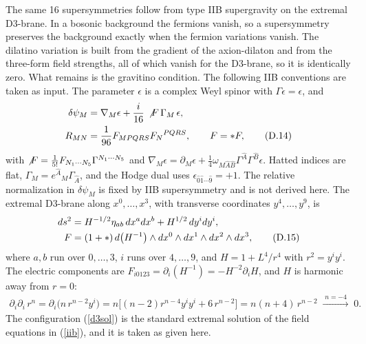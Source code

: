 \begin{tcolorbox}[breakable]
\begin{remark}
The same 16 supersymmetries follow from type IIB supergravity on the extremal D3-brane. In a bosonic background the fermions vanish, so a supersymmetry preserves the background exactly when the fermion variations vanish. The dilatino variation is built from the gradient of the axion-dilaton and from the three-form field strengths, all of which vanish for the D3-brane, so it is identically zero. What remains is the gravitino condition. The following IIB conventions are taken as input. The parameter $\epsilon$ is a complex Weyl spinor with $\Gamma\epsilon=\epsilon$, and
\begin{align}
\delta\psi_M &= \nabla_M\epsilon + \frac{i}{16}\,\slashed F\,\Gamma_M\,\epsilon, \notag\\
R_{MN} &= \frac{1}{96}F_{MPQRS}F_N{}^{PQRS}, \qquad F = *F ,
\tag{D.14}\label{iib}
\end{align}
with $\slashed F = \frac{1}{5!}F_{N_1\cdots N_5}\Gamma^{N_1\cdots N_5}$ and $\nabla_M\epsilon = \partial_M\epsilon + \frac14\omega_{M\hat A\hat B}\Gamma^{\hat A}\Gamma^{\hat B}\epsilon$. Hatted indices are flat, $\Gamma_M = e^{\hat A}{}_M\Gamma_{\hat A}$, and the Hodge dual uses $\epsilon_{\hat0\hat1\cdots\hat9} = +1$. The relative normalization in $\delta\psi_M$ is fixed by IIB supersymmetry and is not derived here. The extremal D3-brane along $x^0,\dots,x^3$, with transverse coordinates $y^4,\dots,y^9$, is
\begin{align}
ds^2 &= H^{-1/2}\eta_{ab}\,dx^a dx^b + H^{1/2}\,dy^i dy^i, \notag\\
F &= (1+*)\,d\big(H^{-1}\big)\wedge dx^0\wedge dx^1\wedge dx^2\wedge dx^3 ,
\tag{D.15}\label{d3sol}
\end{align}
where $a,b$ run over $0,\dots,3$, $i$ runs over $4,\dots,9$, and $H = 1+L^4/r^4$ with $r^2 = y^iy^i$. The electric components are $F_{i0123} = \partial_i(H^{-1}) = -H^{-2}\partial_iH$, and $H$ is harmonic away from $r=0$:
\begin{align*}
\partial_i\partial_i\, r^n = \partial_i\big(n\,r^{n-2}y^i\big) = n\big[(n-2)r^{n-4}y^iy^i + 6\,r^{n-2}\big] = n(n+4)\,r^{n-2} \;\xrightarrow{\;n=-4\;}\; 0 .
\end{align*}
The configuration (\ref{d3sol}) is the standard extremal solution of the field equations in (\ref{iib}), and it is taken as given here.


\end{remark}
\end{tcolorbox}
